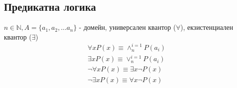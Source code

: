 \documentclass[12pt]{article}
\begin{document}
    \subsection*{Предикатна логика}
    \( n \in \mathbb{N}, A = \{ a_1, a_2, \dots a_n \} \) - домейн, универсален квантор (\( \forall \)), екзистенциален квантор (\( \exists \)) \\
    \begin{gather*}
        \forall x P(x) \equiv \land^{i=1}_{n} P(a_i) \\
        \exists x P(x) \equiv \lor^{i=1}_{n} P(a_i) \\
        \neg \forall x P(x) \equiv \exists x \neg P(x) \\
        \neg \exists x P(x) \equiv \forall x \neg P(x)
    \end{gather*}
    
\end{document}
